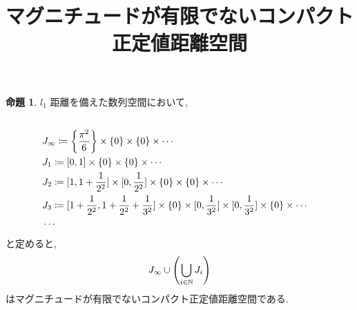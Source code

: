 \documentclass[10pt, fleqn, label-section=none]{bxjsarticle}
\title{マグニチュードが有限でないコンパクト正定値距離空間}
\date{}
\author{}
\theoremstyle{definition}
\newtheorem{prop}[dfn]{命題}
\newcommand{\paren}[1]{\mleft( #1\mright )}
\newcommand{\cbra}[1]{\mleft\{#1\mright\}}
\renewcommand{\;}{\, ; \,}
\begin{document}
\maketitle

\section{}

\begin{prop}$l_1$ 距離を備えた数列空間において, 
\begin{align*} 
\\&J_\infty \coloneqq \cbra{\frac{\pi^2}{6}} \times \cbra{0} \times \cbra{0} \times \cdots 
\\&J_1 \coloneqq [0, 1] \times \cbra{0} \times \cbra{0} \times \cdots  
\\& J_2 \coloneqq [1, 1 + \frac{1}{2^2}] \times [0, \frac{1}{2^2}] \times \cbra{0} \times \cbra{0} \times \cdots 
\\&J_3 \coloneqq [1 + \frac{1}{2^2}, 1 + \frac{1}{2^2} + \frac{1}{3^2} ] \times \cbra{0} \times [0, \frac{1}{3^2}]  \times [0, \frac{1}{3^2}] \times \cbra{0} \times \cdots 
\\& \cdots
\end{align*}
と定めると, 
\begin{align*} J_\infty \cup \paren{\bigcup_{i \in \mathbb N} J_i }  \end{align*}
はマグニチュードが有限でないコンパクト正定値距離空間である. 
\end{prop}
\end{document}
